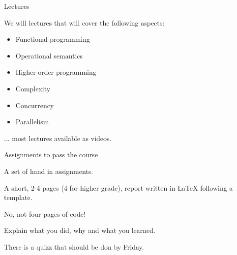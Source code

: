 \begin{frame}{Lectures}

   We will lectures that will cover the following aspects:

  \begin{itemize}
    \item Functional programming
\pause
    \item Operational semantics
\pause
    \item Higher order programming
\pause
    \item Complexity 
\pause
    \item Concurrency 
\pause
    \item Parallelism
  \end{itemize}

\vspace{20pt}\hspace{40pt} ... most lectures available as videos.  

\end{frame}

\begin{frame}{Assignments to pass the course}

  A set of hand in assignments.

  \vspace{20pt}\pause
  A short, 2-4 pages (4 for higher grade), report written in LaTeX following a template.

  \vspace{20pt}\pause
  No, not four pages of code!

  \vspace{20pt}\pause
  Explain what you did, why and what you learned.

  \vspace{20pt}\pause
  There is a quizz that should be don by Friday.
  
\end{frame}


